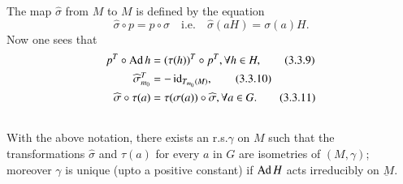 \begin{defi*}
The map $\widehat{\sigma}$ from $M$ to $M$ is defined by the equation
$$
\widehat{\sigma}\circ p=p\circ\sigma\quad\text{i.e.}\quad \widehat{\sigma}(aH)=\sigma(a)H.
$$
Now one sees that
\begin{align*}
 p^{T}\circ \operatorname{Ad} h & =(\tau(h))^{T}\circ p^{T},\forall h\in
  H,\tag{3.3.9}\label{chap3:3.3.9}\\
  \widehat{\sigma}^{T}_{m_{0}}& =
  -\operatorname{id}_{T_{m_{0}}(M)},\tag{3.3.10}\label{chap3:3.3.10}\\ 
\widehat{\sigma}\circ\tau(a) & =\tau(\sigma(a))\circ\widehat{\sigma},\forall
a\in G.\tag{3.3.11}\label{chap3:3.3.11}
\end{align*}\pageoriginale
\end{defi*}

\setcounter{subsection}{11}

\subsection{}\label{chap3:3.3.12}

\begin{prop*}
With the above notation, there exists an r.s.\@ $\gamma$ on $M$ such
that the transformations $\widehat{\sigma}$ and $\tau(a)$ for every
$a$ in $G$ are isometries of $(M,\gamma)$; moreover $\gamma$ is unique
(upto a positive constant) if $\operatorname{Ad} H$ acts irreducibly on
$\underbar{M}$. 
\end{prop*}

